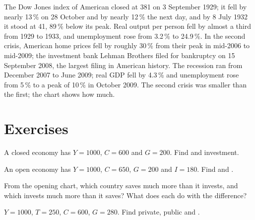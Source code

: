 \begin{record}
The Dow Jones index of American  closed at 381 on 3 September 1929; it fell by nearly 13\,\% on 28 October and by nearly 12\,\% the next day, and by 8 July 1932 it stood at
41, 89\,\% below its peak. Real output per person fell by almost a third from 1929 to 1933, and unemployment rose from 3.2\,\% to 24.9\,\%. In the second crisis, American
home prices fell by roughly 30\,\% from their peak in mid-2006 to mid-2009; the investment bank Lehman Brothers filed for bankruptcy on 15 September 2008, the largest
filing in American history. The recession ran from December 2007 to June 2009; real GDP fell by 4.3\,\% and unemployment rose from 5\,\% to a peak of 10\,\% in October
2009. The second crisis was smaller than the first; the chart shows how much.
\end{record}

\section{Exercises}

\begin{exercise}[$\star$]\label{exo:g12:saving-and-investment:1}
A closed economy has $Y = 1000$, $C = 600$ and $G = 200$. Find  and investment.
\end{exercise}

\begin{exercise}[$\star$]\label{exo:g12:saving-and-investment:2}
An open economy has $Y = 1000$, $C = 650$, $G = 200$ and $I = 180$. Find  and .
\end{exercise}

\begin{exercise}[$\star$]\label{exo:g12:saving-and-investment:3}
From the opening chart, which country saves much more than it invests, and which invests much more than it saves? What does each do with the difference?
\end{exercise}

\begin{exercise}[$\star$]\label{exo:g12:saving-and-investment:4}
$Y = 1000$, $T = 250$, $C = 600$, $G = 280$. Find private, public and .
\end{exercise}

